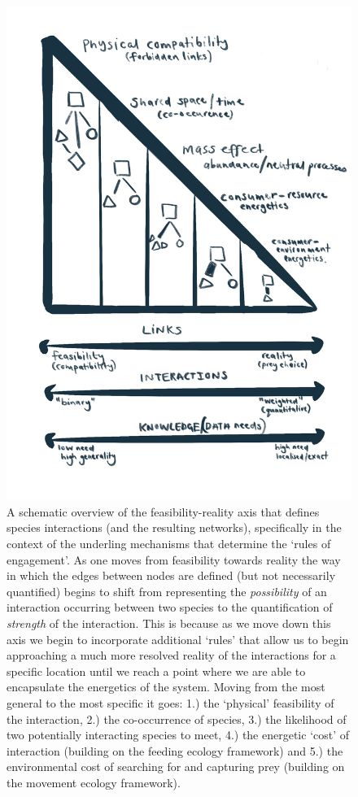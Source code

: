 \documentclass[
]{article}
\begin{document}
\begin{tcolorbox}
\begin{figure}[H]
{\includegraphics{images/mechanism.png}

}

\caption{\label{fig-feasibility}A schematic overview of the
feasibility-reality axis that defines species interactions (and the
resulting networks), specifically in the context of the underling
mechanisms that determine the `rules of engagement'. As one moves from
feasibility towards reality the way in which the edges between nodes are
defined (but not necessarily quantified) begins to shift from
representing the \emph{possibility} of an interaction occurring between
two species to the quantification of \emph{strength} of the interaction.
This is because as we move down this axis we begin to incorporate
additional `rules' that allow us to begin approaching a much more
resolved reality of the interactions for a specific location until we
reach a point where we are able to encapsulate the energetics of the
system. Moving from the most general to the most specific it goes: 1.)
the `physical' feasibility of the interaction, 2.) the co-occurrence of
species, 3.) the likelihood of two potentially interacting species to
meet, 4.) the energetic `cost' of interaction (building on the feeding
ecology framework) and 5.) the environmental cost of searching for and
capturing prey (building on the movement ecology framework).}


\end{figure}
\end{tcolorbox}
\end{document}
